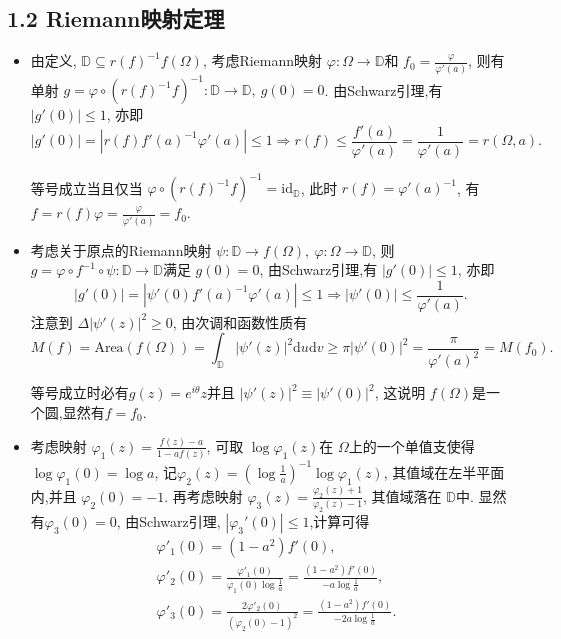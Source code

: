 \subsection*{1.2 Riemann映射定理}
\begin{itemize}
    \item[1.2.1]
由定义, $\mathbb{D}\subseteq r(f)^{-1}f(\Omega)$, 
考虑Riemann映射 $\varphi:\Omega\to \mathbb{D}$和
$f_0 = \frac{\varphi}{\varphi'(a)}$, 
则有单射 $g = \varphi\circ (r(f)^{-1}f)^{-1}: \mathbb{D} \to \mathbb{D},
\ g(0) = 0$. 由Schwarz引理,有 $|g'(0)|\le 1$, 亦即
$$|g'(0)| = |r(f) f'(a)^{-1} \varphi'(a) |\le 1 \Rightarrow r(f)
\le \frac{f'(a)}{\varphi'(a)} = \frac{1}{\varphi'(a)} = r(\Omega,a). $$

等号成立当且仅当 $\varphi\circ (r(f)^{-1}f)^{-1} = \text{id}_{\mathbb{D}}$, 
此时 $r(f) = \varphi'(a)^{-1}$, 
有 $f = r(f)\varphi = \frac{\varphi}{\varphi'(a)} = f_0$.


    \item[1.2.2]

考虑关于原点的Riemann映射 $\psi:\mathbb{D}\to  f(\Omega),
\ \varphi:\Omega\to \mathbb{D}$, 
则$g = \varphi\circ f^{-1} \circ \psi: \mathbb{D}\to \mathbb{D}$满足 $g(0) = 0$, 
由Schwarz引理,有 $|g'(0)|\le 1$, 亦即
$$|g'(0)| =|\psi'(0) f'(a)^{-1} \varphi'(a)|\le 1
\Rightarrow |\psi'(0)|\le \frac{1}{\varphi'(a)}.$$
注意到 $\Delta |\psi'(z)|^2\ge 0$, 由次调和函数性质有
$$M(f) = \text{Area}(f(\Omega)) 
= \int_{\mathbb{D}}|\psi'(z)|^2\mathrm{d}u\mathrm{d}v 
\ge \pi |\psi'(0)|^2 =\frac{\pi}{\varphi'(a)^2}  = M(f_0).$$

等号成立时必有$g(z)= e^{i\theta}z$并且 $|\psi'(z)|^2 \equiv |\psi'(0)|^2$, 
这说明 $f(\Omega)$是一个圆,显然有$f = f_0$.


    \item[1.2.3]

考虑映射 $\varphi_1(z) = \frac{f(z)-a}{1-af(z)}$, 
可取 $\log\varphi_1(z)$在 $\Omega$上的一个单值支使得 $\log\varphi_1(0) = \log a$, 
记$\varphi_2(z) =(\log \frac{1}{a})^{-1} \log\varphi_1(z)$, 
其值域在左半平面内,并且 $\varphi_2(0) = -1$. 
再考虑映射 $\varphi_3(z) = \frac{\varphi_2(z)+1}{\varphi_2(z)-1}$, 
其值域落在 $\mathbb{D}$中. 显然有$\varphi_3(0) = 0$, 
由Schwarz引理, $|\varphi_3'(0)|\le 1$,计算可得
\begin{align*}
    &\varphi'_1(0) = (1-a^2)f'(0),\\
    &\varphi'_2(0) = \frac{\varphi'_1(0)}{\varphi_1(0)\log \frac{1}{a} } 
    = \frac{(1-a^2)f'(0)}{-a\log \frac{1}{a} },\\
    &\varphi'_3(0) = \frac{2\varphi'_2(0)}{(\varphi_2(0)-1)^2} 
    = \frac{(1-a^2)f'(0)}{-2a\log \frac{1}{a} }.
\end{align*}


\end{itemize}

